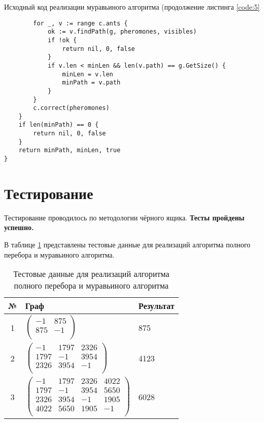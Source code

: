 \newpage

\begin{code}
\caption{Исходный код реализации муравьиного алгоритма (продолжение листинга \ref{code:5}}
\label{code:6}
\begin{verbatim}
		for _, v := range c.ants {
			ok := v.findPath(g, pheromones, visibles)
			if !ok {
				return nil, 0, false
			}
			if v.len < minLen && len(v.path) == g.GetSize() {
				minLen = v.len
				minPath = v.path
			}
		}
		c.correct(pheromones)
	}
	if len(minPath) == 0 {
		return nil, 0, false
	}
	return minPath, minLen, true
}
\end{verbatim}
\end{code}


\section{Тестирование}
Тестирование проводилось по методологии чёрного ящика. \textbf{Тесты пройдены успешно.}

В таблице \ref{table:tests}  представлены тестовые данные для реализаций алгоритма полного перебора и муравьиного алгоритма. 

\begin{table}[H]
  \caption{\label{table:tests} Тестовые данные для реализаций алгоритма полного перебора и муравьиного алгоритма}
  \begin{center}
    \begin{tabular}{|c|l|l|}
      \hline
      № & Граф & Результат \\ \hline
      1 
      & 
      $\begin{pmatrix}
	  -1 & 875 \\
875 & -1 \\
	  \end{pmatrix}$
      &
      875
      \\ \hline
      
      2 
      & 
      $\begin{pmatrix}
	  -1 &	1797 &	2326 \\
1797 &	-1 &	3954 \\
2326 &	3954 &	-1 \\
	  \end{pmatrix}$
      &
      4123
      \\ \hline
      
      3 
      & 
      $\begin{pmatrix}
	  -1 &	1797 &	2326 &	4022 \\
1797 &	-1 &	3954 &	5650 \\
2326 &	3954 &	-1 &	1905 \\
4022 &	5650 &	1905 &	-1 \\
	  \end{pmatrix}$
      &
      6028
      \\ \hline
    \end{tabular}
  \end{center}
\end{table}

\newpage